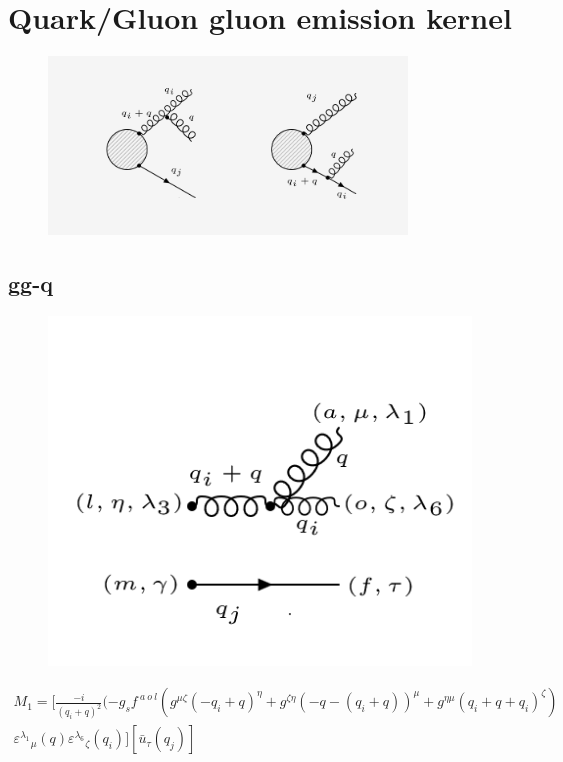 \section{Quark/Gluon gluon emission kernel}

\begin{figure}[ht!]
\centering
\includegraphics[width=0.85\textwidth]{images/ggq-diagrams.png}
\end{figure}
\subsection{gg-q}
\begin{figure}[ht!]
\centering
\includegraphics[scale=0.7]{images/ggqM1.png}
\end{figure}
\begin{equation}
\begin{split}
M_1=[\frac{-i}{(q_i +q)^2}(-g_s f^{\:a\:o\:l}(g^{{\mu}{\zeta}}(-q_i +q)^{\eta}+g^{{\zeta}{\eta}}(-q-(q_i +q))^{\mu}+g^{{\eta}{\mu}}(q_i +q+q_i)^{\zeta})\\
{\varepsilon^{\lambda_1}}_{\mu} (q) {\varepsilon^{\lambda_6}}_{\zeta} (q_i)][\bar{u}_{\tau}(q_j)]
\end{split}
\end{equation}

